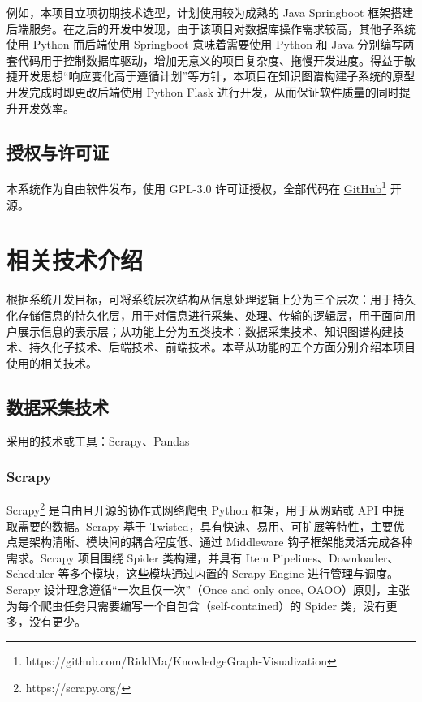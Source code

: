 \documentclass[a4paper,AutoFakeBold,oneside,12pt]{book}
\begin{document}
例如，本项目立项初期技术选型，计划使用较为成熟的 Java Springboot 框架搭建后端服务。在之后的开发中发现，由于该项目对数据库操作需求较高，其他子系统使用 Python 而后端使用 Springboot 意味着需要使用 Python 和 Java 分别编写两套代码用于控制数据库驱动，增加无意义的项目复杂度、拖慢开发进度。得益于敏捷开发思想“响应变化高于遵循计划”等方针，本项目在知识图谱构建子系统的原型开发完成时即更改后端使用 Python Flask 进行开发，从而保证软件质量的同时提升开发效率。

\section{授权与许可证}

本系统作为自由软件\cite{libre_software}发布，使用 GPL-3.0\cite{gpl_v3} 许可证授权，全部代码在 \href{https://github.com/RiddMa/KnowledgeGraph-Visualization}{GitHub}\footnote{https://github.com/RiddMa/KnowledgeGraph-Visualization} 开源。

\chapter{相关技术介绍}

根据系统开发目标，可将系统层次结构从信息处理逻辑上分为三个层次：用于持久化存储信息的持久化层，用于对信息进行采集、处理、传输的逻辑层，用于面向用户展示信息的表示层；从功能上分为五类技术：数据采集技术、知识图谱构建技术、持久化子技术、后端技术、前端技术。本章从功能的五个方面分别介绍本项目使用的相关技术。

\section{数据采集技术}

采用的技术或工具：Scrapy、Pandas

\subsection{Scrapy}

Scrapy\footnote{https://scrapy.org/} 是自由且开源的协作式网络爬虫 Python 框架，用于从网站或 API 中提取需要的数据。Scrapy 基于 Twisted，具有快速、易用、可扩展等特性，主要优点是架构清晰、模块间的耦合程度低、通过 Middleware 钩子框架能灵活完成各种需求。Scrapy 项目围绕 Spider 类构建，并具有 Item Pipelines、Downloader、Scheduler 等多个模块，这些模块通过内置的 Scrapy Engine 进行管理与调度。Scrapy 设计理念遵循“一次且仅一次”（Once and only once, OAOO）原则，主张为每个爬虫任务只需要编写一个自包含（self-contained）的 Spider 类，没有更多，没有更少。
\end{document}

